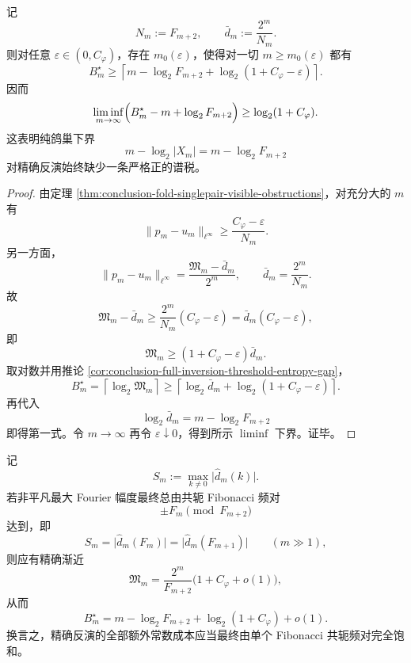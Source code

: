 \begin{corollary}[精确反演存在严格的谱税下界]\label{cor:conclusion-full-inversion-positive-spectral-tax}
记
\[
N_m:=F_{m+2},
\qquad
\bar d_m:=\frac{2^m}{N_m}.
\]
则对任意 \(\varepsilon\in(0,C_\varphi)\)，存在 \(m_0(\varepsilon)\)，使得对一切 \(m\ge m_0(\varepsilon)\) 都有
\[
B_m^\star
\ge
\left\lceil
m-\log_2F_{m+2}+\log_2(1+C_\varphi-\varepsilon)
\right\rceil.
\]
因而
\[
\liminf_{m\to\infty}
\Bigl(
B_m^\star-m+\log_2F_{m+2}
\Bigr)
\ge
\log_2(1+C_\varphi).
\]
这表明纯鸽巢下界
\[
m-\log_2|X_m|
=
m-\log_2F_{m+2}
\]
对精确反演始终缺少一条严格正的谱税。
\end{corollary}
\begin{proof}
由定理 \ref{thm:conclusion-fold-singlepair-visible-obstructions}，对充分大的 \(m\) 有
\[
\|p_m-u_m\|_{\ell^\infty}
\ge
\frac{C_\varphi-\varepsilon}{N_m}.
\]
另一方面，
\[
\|p_m-u_m\|_{\ell^\infty}
=
\frac{\mathfrak M_m-\bar d_m}{2^m},
\qquad
\bar d_m=\frac{2^m}{N_m}.
\]
故
\[
\mathfrak M_m-\bar d_m
\ge
\frac{2^m}{N_m}(C_\varphi-\varepsilon)
=
\bar d_m(C_\varphi-\varepsilon),
\]
即
\[
\mathfrak M_m\ge (1+C_\varphi-\varepsilon)\bar d_m.
\]
取对数并用推论 \ref{cor:conclusion-full-inversion-threshold-entropy-gap}，
\[
B_m^\star
=
\left\lceil \log_2\mathfrak M_m\right\rceil
\ge
\left\lceil
\log_2\bar d_m+\log_2(1+C_\varphi-\varepsilon)
\right\rceil.
\]
再代入
\[
\log_2\bar d_m=m-\log_2F_{m+2}
\]
即得第一式。令 \(m\to\infty\) 再令 \(\varepsilon\downarrow 0\)，得到所示 \(\liminf\) 下界。证毕。
\end{proof}

\begin{conjecture}\label{conj:conclusion-fibonacci-conjugate-pair-saturates-inversion-tax}
记
\[
S_m:=\max_{k\ne 0}\bigl|\widehat d_m(k)\bigr|.
\]
若非平凡最大 Fourier 幅度最终总由共轭 Fibonacci 频对
\[
\pm F_m\pmod{F_{m+2}}
\]
达到，即
\[
S_m=\bigl|\widehat d_m(F_m)\bigr|=\bigl|\widehat d_m(F_{m+1})\bigr|
\qquad
(m\gg 1),
\]
则应有精确渐近
\[
\mathfrak M_m
=
\frac{2^m}{F_{m+2}}\bigl(1+C_\varphi+o(1)\bigr),
\]
从而
\[
B_m^\star
=
m-\log_2F_{m+2}+\log_2(1+C_\varphi)+o(1).
\]
换言之，精确反演的全部额外常数成本应当最终由单个 Fibonacci 共轭频对完全饱和。
\end{conjecture}
